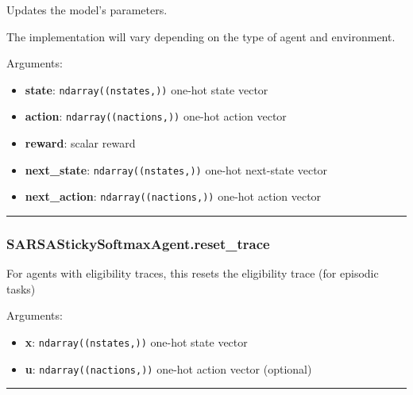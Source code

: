 Updates the model's parameters.

The implementation will vary depending on the type of agent and
environment.

Arguments:

\begin{itemize}
\tightlist
\item
  \textbf{state}: \texttt{ndarray((nstates,))} one-hot state vector
\item
  \textbf{action}: \texttt{ndarray((nactions,))} one-hot action vector
\item
  \textbf{reward}: scalar reward
\item
  \textbf{next\_state}: \texttt{ndarray((nstates,))} one-hot next-state
  vector
\item
  \textbf{next\_action}: \texttt{ndarray((nactions,))} one-hot action
  vector
\end{itemize}

\begin{center}\rule{0.5\linewidth}{\linethickness}\end{center}

\subsubsection{SARSAStickySoftmaxAgent.reset\_trace}\label{sarsastickysoftmaxagent.reset_trace}

\begin{Shaded}
\begin{Highlighting}[]
\OperatorTok{=}\NormalTok{)}
\end{Highlighting}
\end{Shaded}

For agents with eligibility traces, this resets the eligibility trace
(for episodic tasks)

Arguments:

\begin{itemize}
\tightlist
\item
  \textbf{x}: \texttt{ndarray((nstates,))} one-hot state vector
\item
  \textbf{u}: \texttt{ndarray((nactions,))} one-hot action vector
  (optional)
\end{itemize}

\begin{center}\rule{0.5\linewidth}{\linethickness}\end{center}

